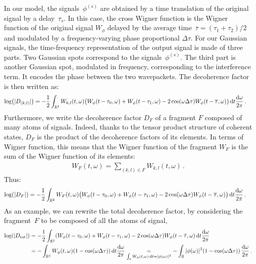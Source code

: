 In our model, the signals~$\phi^{(s)}$ are obtained by a time
translation of the original signal by a delay~$\tau_s$. In
this case, the cross Wigner function is the Wigner function
of the original signal $W_\phi$ delayed by the average time~$\overline{\tau} =
(\tau_1 + \tau_2)/2$ and
modulated by a frequency-varying phase proportional $\Delta\tau$. 
For our Gaussian signals, the time-frequency representation of the output
signal is made of three parts. Two Gaussian spots correspond to the
signals~$\phi^{(s)}$. The third part is another Gaussian spot, modulated in
frequency, corresponding to the interference term. It encodes the phase between
the two wavepackets.
The decoherence factor is then written as:
%
\begin{align}
\log(|D_{(k,l)}|) &=-\frac{1}{2} 
	\int_{\mathbb{R}^2} 
		W_{k,l}(t,\omega)
		\big(W_\phi(t-\tau_0,\omega) 
		+ W_\phi(t-\tau_1,\omega) 
		-2 \cos(\omega\Delta\tau)  W_\phi(t-\overline{\tau},\omega)
		\big)
	\, \mathrm{d} t \frac{\mathrm{d}\omega}{2\pi}
\,.
\label{eq/timefreqrepdecoherencecohernet}
\end{align}
Furthermore, we write the decoherence
factor $D_F$ of a fragment $F$ composed of many atoms of
signals. Indeed, thanks to the tensor product
structure of coherent states, $D_F$ is the product of the
decoherence factors of its elements. In terms of Wigner
function, this means that the Wigner function of the fragment
$W_F$ is the sum of the Wigner function of its elements:
%
\begin{align}
W_F(t,\omega) = \sum_{(k,l)\in F} W_{k,l}(t,\omega)
\,.
\end{align}
Thus:
%
\begin{align}
\log(|D_F|) &=-\frac{1}{2} 
	\int_{\mathbb{R}^2} 
		W_F(t,\omega)
		\big(W_\phi(t-\tau_0,\omega) 
		+ W_\phi(t-\tau_1,\omega) 
		-2 \cos(\omega\Delta\tau)  W_\phi(t-\overline{\tau},\omega)
		\big)
	\, \mathrm{d} t \frac{\mathrm{d}\omega}{2\pi}
\,.
\end{align}
%
As an example, we can rewrite the total decoherence factor, by considering the
fragment~$F$ to be composed of all the atoms of signal,
%
\begin{align}
\log(|D_{\text{tot}}|) &=-\frac{1}{2} 
	\int_{\mathbb{R}^2} 
		(W_\phi(t-\tau_0,\omega) 
		+ W_\phi(t-\tau_1,\omega) 
		-2 \cos(\omega\Delta\tau) W_\phi(t-\overline{\tau},\omega)
	\, \mathrm{d} t \frac{\mathrm{d}\omega}{2\pi}
\nonumber\\
&=-\int_{\mathbb{R}^2} 
		W_\phi(t,\omega) 
		(1-\cos(\omega\Delta\tau))
	\, \mathrm{d} t \frac{\mathrm{d}\omega}{2\pi}
\underset{\int_{\mathbb{R}}W_\phi(t,\omega) \, \mathrm{d} t = |\phi(\omega)|^2}{=}
-\int_{\mathbb{R}} 
	|\phi(\omega)|^2
	(1-\cos(\omega\Delta\tau))
	\, \frac{\mathrm{d}\omega}{2\pi}
\,.
\end{align}


